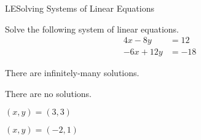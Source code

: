 \documentclass{article}
\begin{document}
\begin{module}{LE}{Solving Systems of Linear Equations}
\begin{readinessAssuranceTest}
\item Solve the following system of linear equations.
      \begin{align*}
      4x-8y   &= 12 \\
      -6x+12y  &=  -18
      \end{align*}

\begin{multicols}{4}
\begin{readinessAssuranceTestChoices}
\item There are infinitely-many solutions. %
\item There are no solutions.

\item
\((x,y)=(3,3)\)
\item
\((x,y)=(-2,1)\)

\end{readinessAssuranceTestChoices}
\end{multicols}

\end{readinessAssuranceTest}
\end{module}
\end{document}
